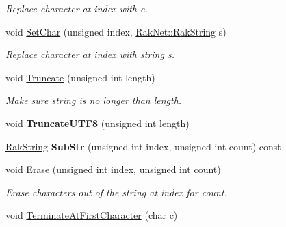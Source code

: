 \begin{DoxyCompactItemize}
\begin{DoxyCompactList}\small\item\em Replace character at index with c. \end{DoxyCompactList}\item 
\hypertarget{class_rak_net_1_1_rak_string_a56f28e7fd28bb8f398dba39e79824af7}{void \hyperlink{class_rak_net_1_1_rak_string_a56f28e7fd28bb8f398dba39e79824af7}{Set\-Char} (unsigned index, \hyperlink{class_rak_net_1_1_rak_string}{Rak\-Net\-::\-Rak\-String} s)}\label{class_rak_net_1_1_rak_string_a56f28e7fd28bb8f398dba39e79824af7}

\begin{DoxyCompactList}\small\item\em Replace character at index with string s. \end{DoxyCompactList}\item 
\hypertarget{class_rak_net_1_1_rak_string_a761d939e79e9e489639c5f707dd3bd76}{void \hyperlink{class_rak_net_1_1_rak_string_a761d939e79e9e489639c5f707dd3bd76}{Truncate} (unsigned int length)}\label{class_rak_net_1_1_rak_string_a761d939e79e9e489639c5f707dd3bd76}

\begin{DoxyCompactList}\small\item\em Make sure string is no longer than {\itshape length}. \end{DoxyCompactList}\item 
\hypertarget{class_rak_net_1_1_rak_string_af8377551dfd7e6123cf44eae49e76f55}{void {\bfseries Truncate\-U\-T\-F8} (unsigned int length)}\label{class_rak_net_1_1_rak_string_af8377551dfd7e6123cf44eae49e76f55}

\item 
\hypertarget{class_rak_net_1_1_rak_string_a1b7fa3b30813c2c30e5b340bbf333cb7}{\hyperlink{class_rak_net_1_1_rak_string}{Rak\-String} {\bfseries Sub\-Str} (unsigned int index, unsigned int count) const }\label{class_rak_net_1_1_rak_string_a1b7fa3b30813c2c30e5b340bbf333cb7}

\item 
\hypertarget{class_rak_net_1_1_rak_string_abdf336f3ab5269642b40261f8353289f}{void \hyperlink{class_rak_net_1_1_rak_string_abdf336f3ab5269642b40261f8353289f}{Erase} (unsigned int index, unsigned int count)}\label{class_rak_net_1_1_rak_string_abdf336f3ab5269642b40261f8353289f}

\begin{DoxyCompactList}\small\item\em Erase characters out of the string at index for count. \end{DoxyCompactList}\item 
\hypertarget{class_rak_net_1_1_rak_string_a79068e21d14ab58af70acbda5820763d}{void \hyperlink{class_rak_net_1_1_rak_string_a79068e21d14ab58af70acbda5820763d}{Terminate\-At\-First\-Character} (char c)}\label{class_rak_net_1_1_rak_string_a79068e21d14ab58af70acbda5820763d}


\end{DoxyCompactItemize}
